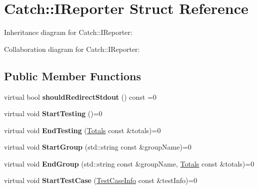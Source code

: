\hypertarget{structCatch_1_1IReporter}{}\section{Catch\+:\+:I\+Reporter Struct Reference}
\label{structCatch_1_1IReporter}


Inheritance diagram for Catch\+:\+:I\+Reporter\+:


Collaboration diagram for Catch\+:\+:I\+Reporter\+:
\subsection*{Public Member Functions}
\begin{DoxyCompactItemize}
\item 
virtual bool {\bfseries should\+Redirect\+Stdout} () const =0\hypertarget{structCatch_1_1IReporter_aebd8c20478de29bba9b5a9f3845c18dc}{}\label{structCatch_1_1IReporter_aebd8c20478de29bba9b5a9f3845c18dc}

\item 
virtual void {\bfseries Start\+Testing} ()=0\hypertarget{structCatch_1_1IReporter_afcf38d6ff912a9b2c7f07da45fcd5cb1}{}\label{structCatch_1_1IReporter_afcf38d6ff912a9b2c7f07da45fcd5cb1}

\item 
virtual void {\bfseries End\+Testing} (\hyperlink{structCatch_1_1Totals}{Totals} const \&totals)=0\hypertarget{structCatch_1_1IReporter_a8f1ae9b07d7feb22f6b1ca61924a6cbf}{}\label{structCatch_1_1IReporter_a8f1ae9b07d7feb22f6b1ca61924a6cbf}

\item 
virtual void {\bfseries Start\+Group} (std\+::string const \&group\+Name)=0\hypertarget{structCatch_1_1IReporter_a8bbe6459db57886e80ee312aa38af8e0}{}\label{structCatch_1_1IReporter_a8bbe6459db57886e80ee312aa38af8e0}

\item 
virtual void {\bfseries End\+Group} (std\+::string const \&group\+Name, \hyperlink{structCatch_1_1Totals}{Totals} const \&totals)=0\hypertarget{structCatch_1_1IReporter_a8b19ae2efce9057bf47e10720c5a4c16}{}\label{structCatch_1_1IReporter_a8b19ae2efce9057bf47e10720c5a4c16}

\item 
virtual void {\bfseries Start\+Test\+Case} (\hyperlink{structCatch_1_1TestCaseInfo}{Test\+Case\+Info} const \&test\+Info)=0\hypertarget{structCatch_1_1IReporter_aeedd3dd4036feec8bd8866383fddacaa}{}\label{structCatch_1_1IReporter_aeedd3dd4036feec8bd8866383fddacaa}


\end{DoxyCompactItemize}
